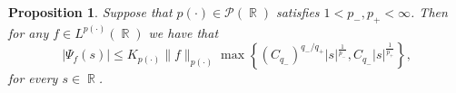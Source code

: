 \documentclass[11pt,reqno]{amsart}
\newtheorem{prop}[theorem]{Proposition}
\theoremstyle{definition}
\theoremstyle{definition}
\theoremstyle{definition}
\DeclareMathOperator{\R}{\mathbb{R}}
\newcommand{\p}{p(\cdot)}
\begin{document}

\begin{prop}\label{prop_bounded_-_+}
    Suppose that $p(\cdot)\in \mathcal{P}(\R)$  satisfies $1<p_{-}, p_{+}<\infty$. Then for any $f\in L^{p(\cdot)}(\R)$ we have that
    \begin{equation}\label{ineq_Psi_bounded}
        |\Psi_f(s)|\leq K_{p(\cdot)}\|f\|_{p(\cdot)}\max\left\{\left(C_{q_{-}}\right)^{q_{-}/q_{+}}|s|^{\frac{1}{p_{-}}},C_{q_{-}}|s|^{\frac{1}{p_{+}}}\right\},
    \end{equation}
    for every $s\in\R$.
\end{prop}
\end{document}
